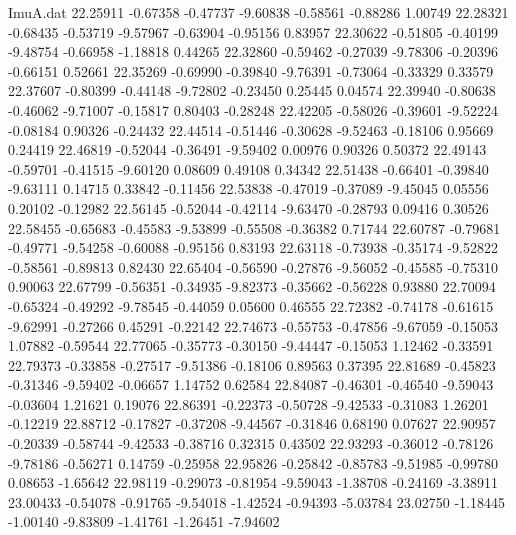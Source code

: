 \begin{filecontents}{ImuA.dat}
  22.25911   -0.67358   -0.47737   -9.60838   -0.58561   -0.88286    1.00749
  22.28321   -0.68435   -0.53719   -9.57967   -0.63904   -0.95156    0.83957
  22.30622   -0.51805   -0.40199   -9.48754   -0.66958   -1.18818    0.44265
  22.32860   -0.59462   -0.27039   -9.78306   -0.20396   -0.66151    0.52661
  22.35269   -0.69990   -0.39840   -9.76391   -0.73064   -0.33329    0.33579
  22.37607   -0.80399   -0.44148   -9.72802   -0.23450    0.25445    0.04574
  22.39940   -0.80638   -0.46062   -9.71007   -0.15817    0.80403   -0.28248
  22.42205   -0.58026   -0.39601   -9.52224   -0.08184    0.90326   -0.24432
  22.44514   -0.51446   -0.30628   -9.52463   -0.18106    0.95669    0.24419
  22.46819   -0.52044   -0.36491   -9.59402    0.00976    0.90326    0.50372
  22.49143   -0.59701   -0.41515   -9.60120    0.08609    0.49108    0.34342
  22.51438   -0.66401   -0.39840   -9.63111    0.14715    0.33842   -0.11456
  22.53838   -0.47019   -0.37089   -9.45045    0.05556    0.20102   -0.12982
  22.56145   -0.52044   -0.42114   -9.63470   -0.28793    0.09416    0.30526
  22.58455   -0.65683   -0.45583   -9.53899   -0.55508   -0.36382    0.71744
  22.60787   -0.79681   -0.49771   -9.54258   -0.60088   -0.95156    0.83193
  22.63118   -0.73938   -0.35174   -9.52822   -0.58561   -0.89813    0.82430
  22.65404   -0.56590   -0.27876   -9.56052   -0.45585   -0.75310    0.90063
  22.67799   -0.56351   -0.34935   -9.82373   -0.35662   -0.56228    0.93880
  22.70094   -0.65324   -0.49292   -9.78545   -0.44059    0.05600    0.46555
  22.72382   -0.74178   -0.61615   -9.62991   -0.27266    0.45291   -0.22142
  22.74673   -0.55753   -0.47856   -9.67059   -0.15053    1.07882   -0.59544
  22.77065   -0.35773   -0.30150   -9.44447   -0.15053    1.12462   -0.33591
  22.79373   -0.33858   -0.27517   -9.51386   -0.18106    0.89563    0.37395
  22.81689   -0.45823   -0.31346   -9.59402   -0.06657    1.14752    0.62584
  22.84087   -0.46301   -0.46540   -9.59043   -0.03604    1.21621    0.19076
  22.86391   -0.22373   -0.50728   -9.42533   -0.31083    1.26201   -0.12219
  22.88712   -0.17827   -0.37208   -9.44567   -0.31846    0.68190    0.07627
  22.90957   -0.20339   -0.58744   -9.42533   -0.38716    0.32315    0.43502
  22.93293   -0.36012   -0.78126   -9.78186   -0.56271    0.14759   -0.25958
  22.95826   -0.25842   -0.85783   -9.51985   -0.99780    0.08653   -1.65642
  22.98119   -0.29073   -0.81954   -9.59043   -1.38708   -0.24169   -3.38911
  23.00433   -0.54078   -0.91765   -9.54018   -1.42524   -0.94393   -5.03784
  23.02750   -1.18445   -1.00140   -9.83809   -1.41761   -1.26451   -7.94602

\end{filecontents}
